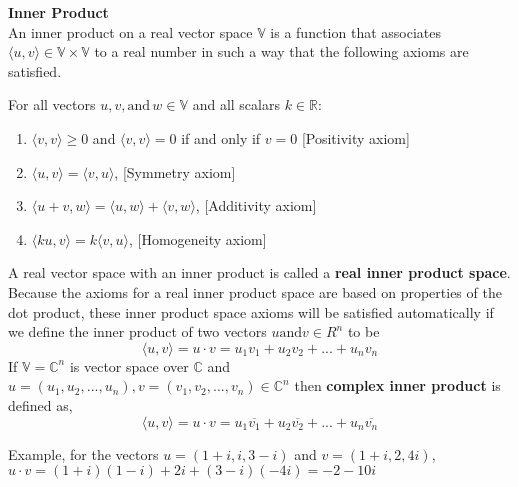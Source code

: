 \documentclass[12pt]{report}
\def\R{{\mathbb R}}
\def\C{{\mathbb C}}
\def\V{{ \mathbb V}}
\begin{document}
\begin{defn}
\textbf{Inner Product}\\
An inner product on a real vector space $\V$  is a function that associates $\langle u, v\rangle \in \V\times \V$ to a real number in such a way that the following axioms are satisfied.

For all vectors $u, v, \text{and}\, w \in \V$ and all scalars $k\in \R$: 
\begin{enumerate}
\item $\langle v,v\rangle \ge 0$ and $\langle v,v\rangle = 0 $ if and only if $v= 0$ [Positivity axiom] 
\item $\langle u,v\rangle = \langle v,u\rangle $, [Symmetry axiom] 
\item $\langle u+v,w\rangle = \langle u,w\rangle + \langle v,w\rangle $, [Additivity axiom]
\item $\langle ku,v\rangle = k\langle v,u\rangle $, [Homogeneity axiom]
\end{enumerate}
A real vector space with an inner product is called a \textbf{real inner product space}.\\
Because the axioms for a real inner product space are based on properties of the dot product, these inner product space axioms will be satisfied automatically if we define the inner product of two vectors $u \text{and} v \in R^n$ to be
\begin{equation}
\langle u,v\rangle = u\cdot v = u_1v_1 + u_2v_2 + ... +u_nv_n 
\end{equation}
If $\V=\C^n$ is vector space over $\C$ and $u = (u_1, u_2, . . . , u_n),v = (v_1, v_2, . . . , v_n) \in \C^n$  then \textbf{complex inner product} is defined as,
\begin{equation}
\langle u,v\rangle = u\cdot v = u_1\overline{v_1} + u_2\overline{v_2} + ... +u_n\overline{v_n} 
\end{equation}
\end{defn}
Example,
for the vectors $u = (1 + i, i, 3 - i)$ and $v = (1 + i, 2, 4i)$,\\
$u \cdot v = (1 + i)(1 - i) + 2i + (3 - i)(-4i) = -2 - 10i$
\end{document}
